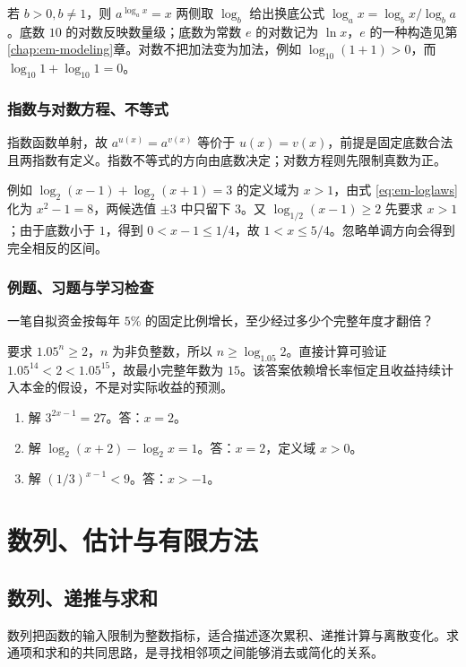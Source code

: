 \documentclass[UTF8]{ctexbook}
\begin{document}
若 $b>0,b\ne1$，则 $a^{\log_a x}=x$ 两侧取 $\log_b$ 给出换底公式 $\log_a x=\log_b x/\log_b a$。底数 $10$ 的对数反映数量级；底数为常数 $e$ 的对数记为 $\ln x$，$e$ 的一种构造见第\ref{chap:em-modeling}章。对数不把加法变为加法，例如 $\log_{10}(1+1)>0$，而 $\log_{10}1+\log_{10}1=0$。

\section{指数与对数方程、不等式}
指数函数单射，故 $a^{u(x)}=a^{v(x)}$ 等价于 $u(x)=v(x)$，前提是固定底数合法且两指数有定义。指数不等式的方向由底数决定；对数方程则先限制真数为正。

例如 $\log_2(x-1)+\log_2(x+1)=3$ 的定义域为 $x>1$，由式 \eqref{eq:em-loglaws} 化为 $x^2-1=8$，两候选值 $\pm3$ 中只留下 $3$。又 $\log_{1/2}(x-1)\ge2$ 先要求 $x>1$；由于底数小于 $1$，得到 $0<x-1\le1/4$，故 $1<x\le5/4$。忽略单调方向会得到完全相反的区间。

\section{例题、习题与学习检查}
\begin{example}
一笔自拟资金按每年 $5\%$ 的固定比例增长，至少经过多少个完整年度才翻倍？
\end{example}
\begin{solve}
要求 $1.05^n\ge2$，$n$ 为非负整数，所以 $n\ge\log_{1.05}2$。直接计算可验证 $1.05^{14}<2<1.05^{15}$，故最小完整年数为 $15$。该答案依赖增长率恒定且收益持续计入本金的假设，不是对实际收益的预测。
\end{solve}
\begin{enumerate}
\item 解 $3^{2x-1}=27$。答：$x=2$。
\item 解 $\log_2(x+2)-\log_2x=1$。答：$x=2$，定义域 $x>0$。
\item 解 $(1/3)^{x-1}<9$。答：$x>-1$。
\end{enumerate}

\part{数列、估计与有限方法}

\chapter{数列、递推与求和}
\label{chap:em-sequences}
数列把函数的输入限制为整数指标，适合描述逐次累积、递推计算与离散变化。求通项和求和的共同思路，是寻找相邻项之间能够消去或简化的关系。
\end{document}
